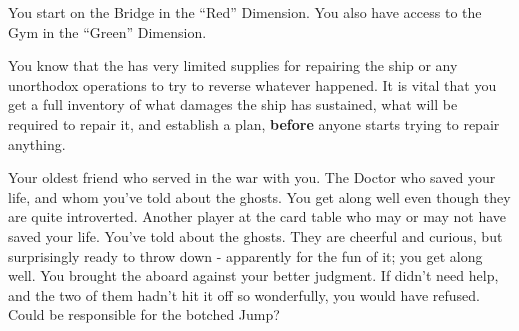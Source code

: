 \documentclass[char]{TMFHope}
\begin{document}
\begin{itemz}[Notes]
	\item You start on the Bridge in the ``Red'' Dimension. You also have access to the Gym in the ``Green'' Dimension. 
	\item You know that the \pNew{} has very limited supplies for repairing the ship or any unorthodox operations to try to reverse whatever happened. It is vital that you get a full inventory of what damages the ship has sustained, what will be required to repair it, and establish a plan, {\bf before} anyone starts trying to repair anything.
\end{itemz}

\begin{contacts}
	\contact{\cXO{}} Your oldest friend who served in the war with you.
	\contact{\cMed{}} The Doctor who saved your life, and whom you've told about the ghosts. You get along well even though they are quite introverted.
	\contact{\cSci{}} Another player at the card table who may or may not have saved your life. You've told \cSci{\them} about the ghosts. They are cheerful and curious, but surprisingly ready to throw down - apparently for the fun of it; you get along well.
	\contact{\cBoy{}} You brought the \cBoy{\kid} aboard against your better judgment. If \cEng{} didn't need help, and the two of them hadn't hit it off so wonderfully, you would have refused. Could \cBoy{} be responsible for the botched Jump?
\end{contacts}
\end{document}
